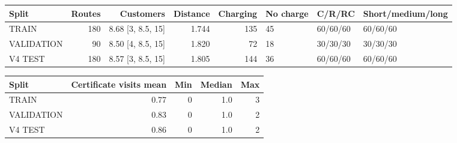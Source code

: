 \begin{tabular}{lrrrrlll}
\hline
Split & Routes & Customers & Distance & Charging & No charge & C/R/RC & Short/medium/long \\
\hline
TRAIN & 180 & 8.68 [3, 8.5, 15] & 1.744 & 135 & 45 & 60/60/60 & 60/60/60 \\
VALIDATION & 90 & 8.50 [4, 8.5, 15] & 1.820 & 72 & 18 & 30/30/30 & 30/30/30 \\
V4 TEST & 180 & 8.57 [3, 8.5, 15] & 1.805 & 144 & 36 & 60/60/60 & 60/60/60 \\
\hline
\end{tabular}

\begin{tabular}{lrrrr}
\hline
Split & Certificate visits mean & Min & Median & Max \\
\hline
TRAIN & 0.77 & 0 & 1.0 & 3 \\
VALIDATION & 0.83 & 0 & 1.0 & 2 \\
V4 TEST & 0.86 & 0 & 1.0 & 2 \\
\hline
\end{tabular}


